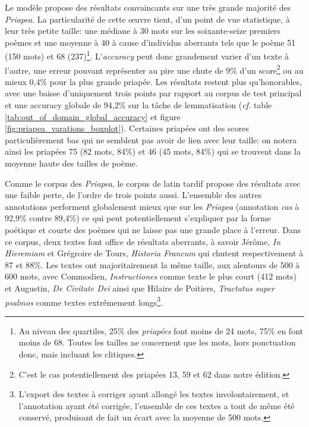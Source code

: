 Le modèle propose des résultats convaincants sur une très grande majorité des \textit{Priapea}. La particularité de cette œuvre tient, d'un point de vue statistique, à leur très petite taille: une médiane à 30 mots sur les soixante-seize premiers poèmes et une moyenne à 40 à cause d'individus aberrants tels que le poème 51 (150 mots) et 68 (237)\footnote{Au niveau des quartiles, 25\% des \textit{priapées} font moins de 24 mots, 75\% en font moins de 68. Toutes les tailles ne concernent que les mots, hors ponctuation donc, mais incluant les clitiques.}. L'\textit{accuracy} peut donc grandement varier d'un texte à l'autre, une erreur pouvant représenter au pire une chute de 9\% d'un score\footnote{C'est le cas potentiellement des priapées 13, 59 et 62 dans notre édition.} ou au mieux 0,4\% pour la plus grande priapée. Les résultats restent plus qu'honorables, avec une baisse d'uniquement trois points par rapport au corpus de test principal et une accuracy globale de 94,2\% sur la tâche de lemmatisation (\textit{cf.} table \ref{tab:out_of_domain_global_accuracy} et figure \ref{fig:priapea_varations_boxplot}). Certaines priapées ont des scores particulièrement bas qui ne semblent pas avoir de lien avec leur taille: on notera ainsi les priapées 75 (82 mots, 84\%) et 46 (45 mots, 84\%) qui se trouvent dans la moyenne haute des tailles de poème.

Comme le corpus des \textit{Priapea}, le corpus de latin tardif propose des résultats avec une faible perte, de l'ordre de trois points aussi. L'ensemble des autres annotations performent globalement mieux que sur les \textit{Priapea} (annotation \textit{cas} à 92,9\% contre 89,4\%) ce qui peut potentiellement s'expliquer par la forme poétique et courte des poèmes qui ne laisse pas une grande place à l'erreur. Dans ce corpus, deux textes font office de résultats aberrants, à savoir Jérôme, \textit{In Hieremiam} et Grégroire de Tours, \textit{Historia Francum} qui chutent respectivement à 87 et 88\%. Les textes ont majoritairement la même taille, aux alentours de 500 à 600 mots, avec Commodien, \textit{Instructiones} comme texte le plus court (412 mots) et Augustin, \textit{De Civitate Dei} ainsi que Hilaire de Poitiers, \textit{Tractatus super psalmos} comme textes extrêmement longs\footnote{L'export des textes à corriger ayant allongé les textes involontairement, et l'annotation ayant été corrigée, l'ensemble de ces textes a tout de même été conservé, produisant de fait un écart avec la moyenne de 500 mots.}.

